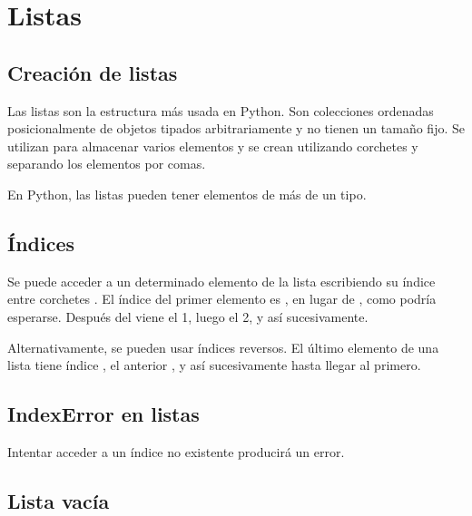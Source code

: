 \chapter{Listas}

\section{Creación de listas}

Las listas son la estructura más usada en Python. Son colecciones ordenadas posicionalmente de objetos tipados arbitrariamente y no tienen un tamaño fijo. Se utilizan para almacenar varios elementos y se crean utilizando corchetes y separando los elementos por comas.


En Python, las listas pueden tener elementos de más de un tipo.


\section{Índices}

Se puede acceder a un determinado elemento de la lista escribiendo su índice entre corchetes \ttt{[]}. El índice del primer elemento es , en lugar de , como podría esperarse. Después del  viene el {1}, luego el {2}, y así sucesivamente.


Alternativamente, se pueden usar índices reversos. El último elemento de una lista tiene índice , el anterior , y así sucesivamente hasta llegar al primero.


\section{IndexError en listas}

Intentar acceder a un índice no existente producirá un error.


\section{Lista vacía}

